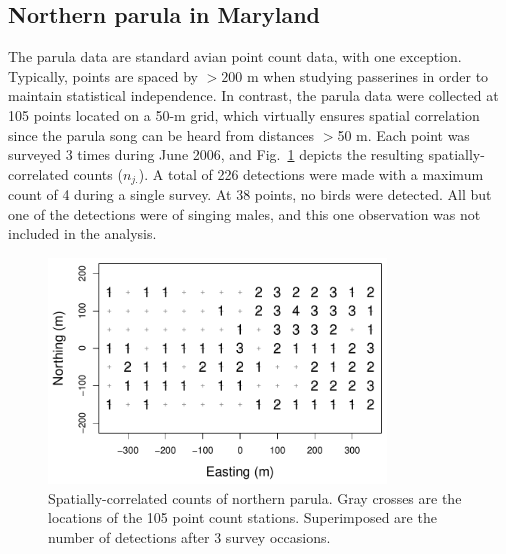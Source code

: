 
\subsection{Northern parula in Maryland}

The parula data are standard avian point count data, with one
exception. Typically, points are spaced by $>200$ m when studying
passerines in order to maintain statistical independence. In contrast,
the parula data were collected at
105 points located on a 50-m grid, which virtually ensures spatial
correlation since the parula song can be heard from distances $>$50 m.
Each point was surveyed 3 times during June 2006, and
Fig.~\ref{fig:nopaDat} depicts the resulting spatially-correlated
counts ($n_{j.}$). A total of 226 detections were made with a maximum
count of 4 during a single survey. At 38 points, no birds were
detected. All but one of the detections were of singing males, and
this one observation was not included in the analysis.

\begin{figure}
  \centering
  \includegraphics[width=0.8\textwidth]{Ch18-Unmarked/figs/nopaCounts}
  \caption{Spatially-correlated counts of northern parula. Gray
    crosses are the locations of the 105 point count
    stations. Superimposed are the number of detections after 3 survey occasions.}
  \label{fig:nopaDat}
\end{figure}

